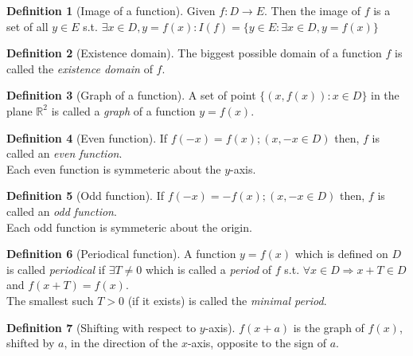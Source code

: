 \documentclass[fleqn]{article}
\theoremstyle{definition}
\newtheorem{definition}{Definition}
\theoremstyle{theorem}
\theoremstyle{remark}
\begin{document}
\begin{definition}[Image of a function]
	Given $f : D \rightarrow E$. Then the image of $f$ is a set of all $y \in E$ s.t. $\exists x \in D, y = f(x) : I(f) = \{ y \in E : \exists x \in D, y = f(x)\}$ \\
\end{definition}

\begin{definition}[Existence domain]
	The biggest possible domain of a function $f$ is called the \emph{existence domain} of $f$. \\
\end{definition}

\begin{definition}[Graph of a function]
	A set of point $\{(x, f(x)) : x \in D\}$ in the plane $\mathbb{R}^2$ is called a \emph{graph} of a function $y = f(x)$. \\
\end{definition}

\begin{definition}[Even function]
	If $f(-x) = f(x) ; (x, -x \in D)$ then, $f$ is called an \emph{even function}. \\
	Each even function is symmeteric about the $y$-axis. \
\end{definition}

\begin{definition}[Odd function]
	If $f(-x) = -f(x) ; (x, -x \in D)$ then, $f$ is called an \emph{odd function}. \\
	Each odd function is symmeteric about the origin. \\
\end{definition}

\begin{definition}[Periodical function]
	A function $y = f(x)$ which is defined on $D$ is called \emph{periodical} if $\exists T \neq 0$ which is called a \emph{period} of $f$ s.t. $\forall x \in D \Rightarrow x + T \in D$ and $f(x+T) = f(x)$. \\
	The smallest such $T > 0$ (if it exists) is called the \emph{minimal period}. \\
\end{definition}

\begin{definition}[Shifting with respect to $y$-axis]
	$f(x+a)$ is the graph of $f(x)$, shifted by $a$, in the direction of the $x$-axis, opposite to the sign of $a$. \\
\end{definition}
\end{document}

